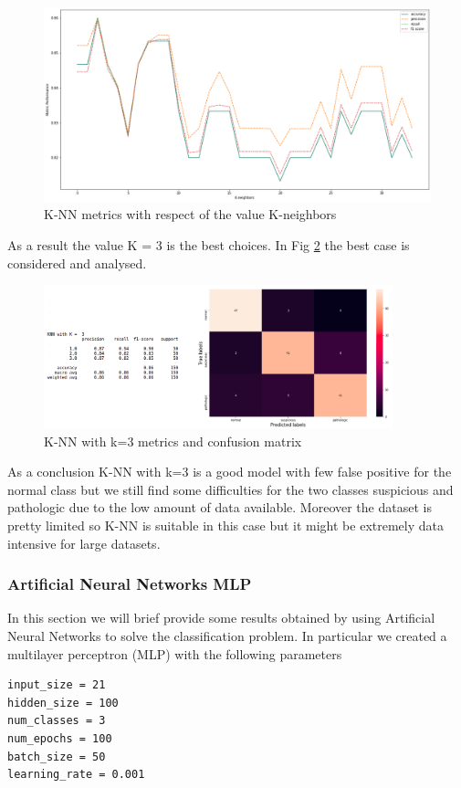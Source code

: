 \documentclass[a4paper,12pt]{article}
\begin{document}
\begin{figure}[H]
  \begin{center}
  \includegraphics[width=1.0\textwidth]{images/knn.png}
  \end{center}
  \caption{K-NN metrics with respect of the value K-neighbors}
  \label{fig:knn}
\end{figure}

\noindent As a result the value K = 3 is the best choices. In Fig \ref{fig:knn2} the best case is considered and analysed.

\begin{figure}[H]
  \begin{center}
  \includegraphics[width=0.9\textwidth]{images/knn2res.png}
  \end{center}
  \caption{K-NN with k=3 metrics and confusion matrix}
  \label{fig:knn2}
\end{figure}


\noindent As a conclusion K-NN with k=3 is a good model with few false positive for the normal class but we still find some difficulties for the two classes suspicious and pathologic due to the low amount of data available. Moreover the dataset is pretty limited so K-NN is suitable in this case but it might be extremely data intensive for large datasets.

\subsubsection{Artificial Neural Networks MLP}
In this section we will brief provide some results obtained by using Artificial Neural Networks to solve the classification problem. In particular we created a multilayer perceptron (MLP) with the following parameters
\begin{Verbatim}[fontsize=\small]
input_size = 21
hidden_size = 100
num_classes = 3
num_epochs = 100
batch_size = 50
learning_rate = 0.001
\end{Verbatim} 
\end{document}
